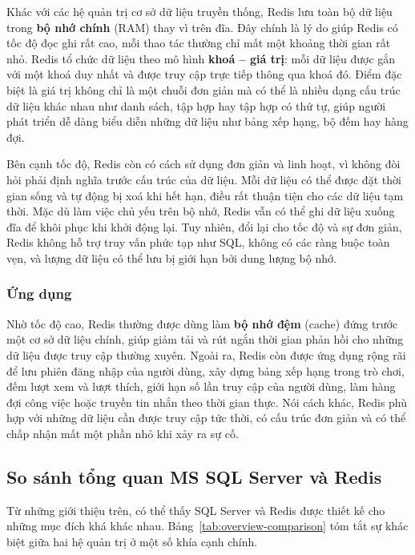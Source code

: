 Khác với các hệ quản trị cơ sở dữ liệu truyền thống, Redis lưu toàn bộ dữ liệu trong \textbf{bộ nhớ chính} (RAM) thay vì trên đĩa. Đây chính là lý do giúp Redis có tốc độ đọc ghi rất cao, mỗi thao tác thường chỉ mất một khoảng thời gian rất nhỏ. Redis tổ chức dữ liệu theo mô hình \textbf{khoá -- giá trị}: mỗi dữ liệu được gắn với một khoá duy nhất và được truy cập trực tiếp thông qua khoá đó. Điểm đặc biệt là giá trị không chỉ là một chuỗi đơn giản mà có thể là nhiều dạng cấu trúc dữ liệu khác nhau như danh sách, tập hợp hay tập hợp có thứ tự, giúp người phát triển dễ dàng biểu diễn những dữ liệu như bảng xếp hạng, bộ đếm hay hàng đợi.

Bên cạnh tốc độ, Redis còn có cách sử dụng đơn giản và linh hoạt, vì không đòi hỏi phải định nghĩa trước cấu trúc của dữ liệu. Mỗi dữ liệu có thể được đặt thời gian sống và tự động bị xoá khi hết hạn, điều rất thuận tiện cho các dữ liệu tạm thời. Mặc dù làm việc chủ yếu trên bộ nhớ, Redis vẫn có thể ghi dữ liệu xuống đĩa để khôi phục khi khởi động lại. Tuy nhiên, đổi lại cho tốc độ và sự đơn giản, Redis không hỗ trợ truy vấn phức tạp như SQL, không có các ràng buộc toàn vẹn, và lượng dữ liệu có thể lưu bị giới hạn bởi dung lượng bộ nhớ.

\subsubsection{Ứng dụng}

Nhờ tốc độ cao, Redis thường được dùng làm \textbf{bộ nhớ đệm} (cache) đứng trước một cơ sở dữ liệu chính, giúp giảm tải và rút ngắn thời gian phản hồi cho những dữ liệu được truy cập thường xuyên. Ngoài ra, Redis còn được ứng dụng rộng rãi để lưu phiên đăng nhập của người dùng, xây dựng bảng xếp hạng trong trò chơi, đếm lượt xem và lượt thích, giới hạn số lần truy cập của người dùng, làm hàng đợi công việc hoặc truyền tin nhắn theo thời gian thực. Nói cách khác, Redis phù hợp với những dữ liệu cần được truy cập tức thời, có cấu trúc đơn giản và có thể chấp nhận mất một phần nhỏ khi xảy ra sự cố.

\subsection{So sánh tổng quan MS SQL Server và Redis}
\label{subsec:mssql-vs-redis}

Từ những giới thiệu trên, có thể thấy SQL Server và Redis được thiết kế cho những mục đích khá khác nhau. Bảng~\ref{tab:overview-comparison} tóm tắt sự khác biệt giữa hai hệ quản trị ở một số khía cạnh chính.

